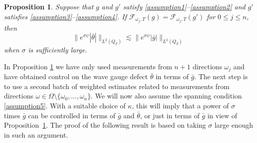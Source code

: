 \documentclass[11pt,letterpaper]{amsart}
\newtheorem{Proposition}[Theorem]{Proposition}
\theoremstyle{definition}
\numberwithin{equation}{section}
\newcommand{\norm}[1]{\lVert #1 \rVert}         %
\begin{document}
\begin{Proposition} \label{prop_thetabar_estimate}
Suppose that $g$ and $g'$ satisfy \eqref{assumption1}--\eqref{assumption2} and $g'$ satisfies \eqref{assumption3}--\eqref{assumption4}. If $\mathcal{F}_{\omega_j,T}(g) = \mathcal{F}_{\omega_j,T}(g')$ for $0 \leq j \leq n$, then 
\begin{equation*}
\norm{e^{\sigma \psi} |\bar{\theta}|}_{L^2(Q_T)}
 \lesssim \norm{e^{\sigma \psi} |\bar{g}|}_{L^2(Q_T)}
\end{equation*}
when $\sigma$ is sufficiently large.
\end{Proposition}


In Proposition \ref{prop_thetabar_estimate} we have only used measurements from $n+1$ directions $\omega_j$ and have obtained control on the wave gauge defect $\bar{\theta}$ in terms of $\bar{g}$. The next step is to use a second batch of weighted estimates related to measurements from directions $\omega \in \Omega \setminus \{ \omega_0, \ldots, \omega_n \}$. We will now also assume the spanning condition \eqref{assumption5}. With a suitable choice of $\kappa$, this will imply that a power of $\sigma$ times $\bar{g}$ can be controlled in terms of $\bar{g}$ and $\bar{\theta}$, or just in terms of $\bar g$ in view of Proposition~\ref{prop_thetabar_estimate}. The proof of the following result is based on taking $\sigma$ large enough in such an argument.
\end{document}
